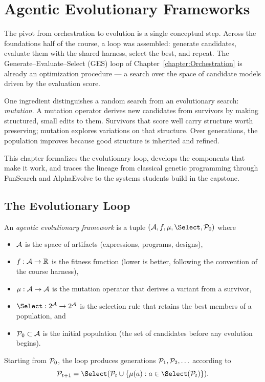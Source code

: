 \chapter{Agentic Evolutionary Frameworks}
\label{chapter:EvolutionaryFrameworks}

The pivot from orchestration to evolution is a single conceptual step.
Across the foundations half of the course, a loop was assembled: generate candidates, evaluate them with the shared harness, select the best, and repeat.
The Generate–Evaluate–Select (GES) loop of Chapter~\ref{chapter:Orchestration} is already an optimization procedure — a search over the space of candidate models driven by the evaluation score.

One ingredient distinguishes a random search from an evolutionary search: \emph{mutation}.
A mutation operator derives new candidates from survivors by making structured, small edits to them.
Survivors that score well carry structure worth preserving; mutation explores variations on that structure.
Over generations, the population improves because good structure is inherited and refined.

This chapter formalizes the evolutionary loop, develops the components that make it work, and traces the lineage from classical genetic programming through FunSearch and AlphaEvolve to the systems students build in the capstone.

\section{The Evolutionary Loop}
\label{section:EvolutionaryLoop}

\begin{definition}
\label{definition:EvolutionaryLoop}
An \emph{agentic evolutionary framework} is a tuple $(\Artifacts, \Fitness, \Mutate, \Select, \Population_0)$ where
\begin{itemize}
\item $\mathcal{A}$ is the space of artifacts (expressions, programs, designs),
\item $f : \mathcal{A} \to \mathbb{R}$ is the fitness function (lower is better, following the convention of the course harness),
\item $\mu : \mathcal{A} \to \mathcal{A}$ is the mutation operator that derives a variant from a survivor,
\item $\Select : 2^{\Artifacts} \to 2^{\Artifacts}$ is the selection rule that retains the best members of a population, and
\item $\mathcal{P}_0 \subset \mathcal{A}$ is the initial population (the set of candidates before any evolution begins).
\end{itemize}
Starting from $\mathcal{P}_0$, the loop produces generations $\mathcal{P}_1, \mathcal{P}_2, \ldots$ according to
\begin{equation}
\Population_{t+1} = \Select(\Population_t \cup \{\Mutate(a) : a \in \Select(\Population_t)\}) .
\label{equation:EvolutionaryLoop}
\end{equation}
\end{definition}

